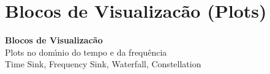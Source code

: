 \documentclass[aspectratio=169]{beamer}
\begin{document}
\section{Blocos de Visualizac\~{a}o (Plots)}

{
\begin{frame}[plain,c]
\begin{center}
{\Huge\textbf{Blocos de Visualizac\~{a}o}}\\[0.8cm]
{\LARGE Plots no dom\'{\i}nio do tempo e da frequ\^{e}ncia}\\[0.5cm]
{\large Time Sink, Frequency Sink, Waterfall, Constellation}
\end{center}
\end{frame}
}
\end{document}
